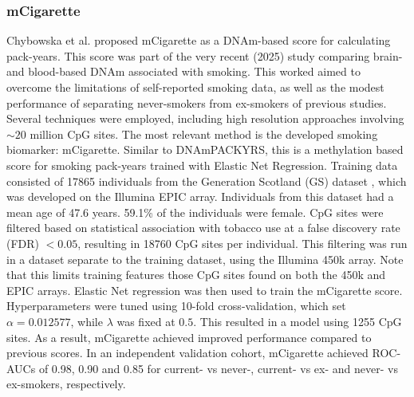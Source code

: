 \documentclass{article} %
\begin{document}
\subsubsection{mCigarette} \label{sec:mcigarette}
Chybowska et al. \cite{chybowska2025blood} proposed mCigarette as a DNAm-based score for calculating pack-years. This score was part of the very recent (2025) study comparing brain- and blood-based DNAm associated with smoking. This worked aimed to overcome the limitations of self-reported smoking data, as well as the modest performance of separating never-smokers from ex-smokers of previous studies. Several techniques were employed, including high resolution approaches involving \(\sim \! 20\) million CpG sites. The most relevant method is the developed smoking biomarker: mCigarette. Similar to DNAmPACKYRS, this is a methylation based score for smoking pack-years trained with Elastic Net Regression. Training data consisted of \num{17865} individuals from the Generation Scotland (GS) dataset \cite{smith2006generation}, which was developed on the Illumina EPIC array. Individuals from this dataset had a mean age of 47.6 years. 59.1\% of the individuals were female. CpG sites were filtered based on statistical association with tobacco use at a false discovery rate (FDR) \(< 0.05\), resulting in \num{18760} CpG sites per individual. This filtering was run in a dataset separate to the training dataset, using the Illumina 450k array. Note that this limits training features those CpG sites found on both the 450k and EPIC arrays. Elastic Net regression was then used to train the mCigarette score. Hyperparameters were tuned using 10-fold cross-validation, which set \(\alpha = 0.012577\), while \(\lambda\) was fixed at \(0.5\). This resulted in a model using \num{1255} CpG sites. As a result, mCigarette achieved improved performance compared to previous scores. In an independent validation cohort, mCigarette achieved ROC-AUCs of 0.98, 0.90 and 0.85 for current- vs never-, current- vs ex- and never- vs ex-smokers, respectively.

\end{document}
